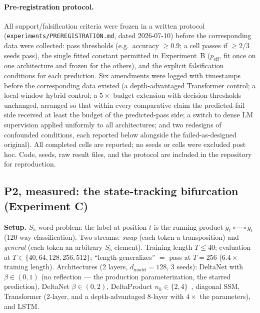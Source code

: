 \paragraph{Pre-registration protocol.}
All support/falsification criteria were frozen in a written protocol
(\texttt{experiments/PREREGISTRATION.md}, dated 2026-07-10) before the
corresponding data were collected: pass thresholds (e.g.\ accuracy $\ge 0.9$;
a cell passes if $\ge 2/3$ seeds pass), the single fitted constant permitted in
Experiment~B ($p_{\mathrm{eff}}$, fit once on one architecture and frozen for
the others), and the explicit falsification conditions for each prediction.
Six amendments were logged with timestamps before the corresponding data
existed (a depth-advantaged Transformer control; a local-window hybrid control;
a $5\times$ budget extension with decision thresholds unchanged, arranged so
that within every comparative claim the predicted-fail side received at least
the budget of the predicted-pass side; a switch to dense LM supervision applied
uniformly to all architectures; and two redesigns of confounded conditions,
each reported below alongside the failed-as-designed original). All completed
cells are reported; no seeds or cells were excluded post hoc. Code, seeds, raw
result files, and the protocol are included in the repository for reproduction.

\subsection{P2, measured: the state-tracking bifurcation (Experiment C)}
\label{sec:expC}

\textbf{Setup.} $S_5$ word problem: the label at position $t$ is the running
product $g_1\!\circ\!\cdots\!\circ\! g_t$ (120-way classification). Two
streams: \emph{swap} (each token a transposition) and \emph{general} (each
token an arbitrary $S_5$ element). Training length $T\!\le\!40$; evaluation at
$T\in\{40,64,128,256,512\}$; ``length-generalizes'' $=$ pass at $T{=}256$
($6.4\times$ training length). Architectures (2 layers, $d_{\mathrm{model}}
{=}128$, 3 seeds): DeltaNet with $\beta\in(0,1)$ (no reflection --- the
production parameterization, the starred prediction), DeltaNet
$\beta\in(0,2)$, DeltaProduct $n_h\in\{2,4\}$~\citep{grazzi2025deltaproduct},
diagonal SSM, Transformer (2-layer, and a depth-advantaged 8-layer with
$4\times$ the parameters), and LSTM.

